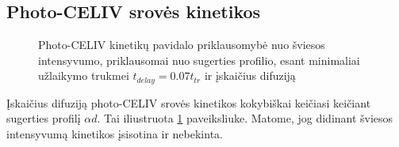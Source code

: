 \subsection{Photo-CELIV srovės kinetikos} 
\begin{figure}[H]
    \centering
  \caption{Photo-CELIV kinetikų pavidalo priklausomybė nuo šviesos intensyvumo, priklausomai nuo sugerties profilio, esant minimaliai užlaikymo trukmei $t_{delay} = 0.07t_{tr}$ ir įskaičius difuziją}
  \label{fig:transients}
\end{figure}

Įskaičius difuziją photo-CELIV srovės kinetikos kokybiškai keičiasi keičiant sugerties profilį $\alpha d$. Tai iliustruota \ref{fig:transients} paveiksliuke. Matome, jog didinant šviesos intensyvumą kinetikos įsisotina ir nebekinta.

